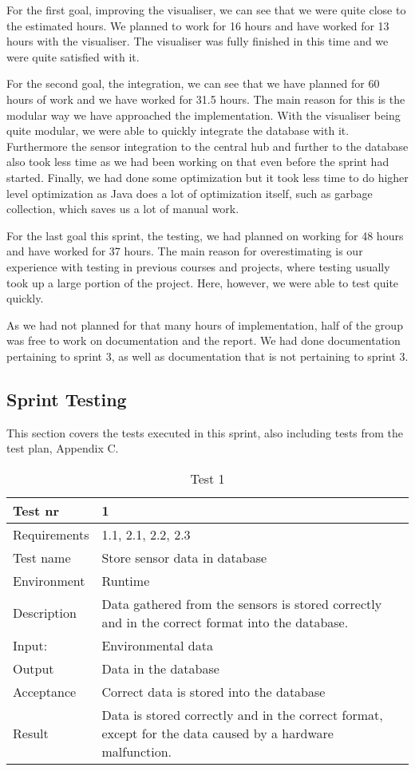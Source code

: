 \documentclass[../document]{subfiles}
\begin{document}
For the first goal, improving the visualiser, we can see that we were quite close to the estimated hours. We planned to work for 16 hours and have worked for 13 hours with the visualiser. The visualiser was fully finished in this time and we were quite satisfied with it.

For the second goal, the integration, we can see that we have planned for 60 hours of work and we have worked for 31.5 hours. The main reason for this is the modular way we have approached the implementation. With the visualiser being quite modular, we were able to quickly integrate the database with it. Furthermore the sensor integration to the central hub and further to the database also took less time as we had been working on that even before the sprint had started. Finally, we had done some optimization but it took less time to do higher level optimization as Java does a lot of optimization itself, such as garbage collection, which saves us a lot of manual work.

For the last goal this sprint, the testing, we had planned on working for 48 hours and have worked for 37 hours. The main reason for overestimating is our experience with testing in previous courses and projects, where testing usually took up a large portion of the project. Here, however, we were able to test quite quickly.

As we had not planned for that many hours of implementation, half of the group was free to work on documentation and the report. We had done documentation pertaining to sprint 3, as well as documentation that is not pertaining to sprint 3.

\subsection{Sprint Testing}
This section covers the tests executed in this sprint, also including tests from the test plan, Appendix C.

\begin{table}[H]
\caption{Test 1}
\centering
\begin{tabularx}{\textwidth}{|l|X|}
	\hline
	Test nr
	&1
	\\ \hline Requirements
	&1.1, 2.1, 2.2, 2.3
	\\ \hline Test name
	&Store sensor data in database
	\\ \hline Environment
	&Runtime
	\\ \hline Description
	&Data gathered from the sensors is stored correctly and in the correct format into the database.
	\\ \hline Input:
	&Environmental data
	\\ \hline Output
	&Data in the database
	\\ \hline Acceptance
	&Correct data is stored into the database
	\\ \hline Result
	&Data is stored correctly and in the correct format, except for the data caused by a hardware malfunction.
	\\ \hline 
\end{tabularx}
\end{table}
\end{document}
